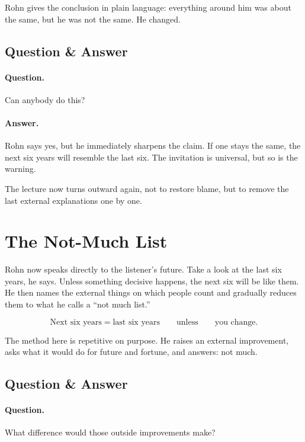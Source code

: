 Rohn gives the conclusion in plain language: everything around him was about the same, but he was not the same. He changed.

\subsection{Question \& Answer}

\paragraph{Question.} Can anybody do this?

\paragraph{Answer.} Rohn says yes, but he immediately sharpens the claim. If one stays the same, the next six years will resemble the last six. The invitation is universal, but so is the warning.

The lecture now turns outward again, not to restore blame, but to remove the last external explanations one by one.

\section{The Not-Much List}

Rohn now speaks directly to the listener's future. Take a look at the last six years, he says. Unless something decisive happens, the next six will be like them. He then names the external things on which people count and gradually reduces them to what he calls a ``not much list.''

\begin{equation}
\text{Next six years}=\text{last six years}
\qquad
\text{unless}
\qquad
\text{you change}.
\end{equation}

The method here is repetitive on purpose. He raises an external improvement, asks what it would do for future and fortune, and answers: not much.

\subsection{Question \& Answer}

\paragraph{Question.} What difference would those outside improvements make?

